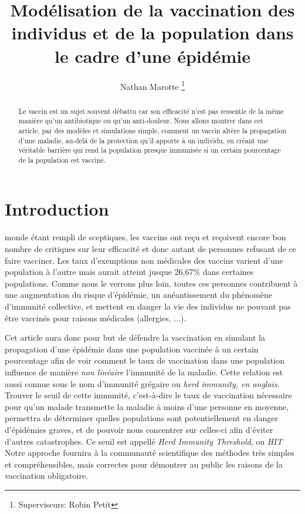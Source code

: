\documentclass[journal, a4paper]{IEEEtran}
\begin{document}
	\title{Modélisation de la vaccination des individus et de la population dans le cadre d'une épidémie}
	\author{Nathan Marotte
	\thanks{Superviseurs: Robin Petit}}
	\maketitle

\begin{abstract}
	Le vaccin est un sujet souvent débattu car son efficacité n'est pas ressentie de la même manière qu'un antibiotique ou qu'un anti-douleur. Nous allons montrer dans cet article, par des modèles et simulations simple, comment un vaccin altère la propagation d'une maladie, au-delà de la protection qu'il apporte à un individu, en créant une véritable barrière qui rend la population presque immunisée si un certain pourcentage de la population est vacciné.
\end{abstract}

\section{Introduction}
	 monde étant rempli de sceptiques, les vaccins ont reçu et reçoivent encore bon nombre de critiques sur leur efficacité et donc autant de personnes refusant de ce faire vacciner. Les taux d'exemptions non médicales des vaccins varient d'une population à l'autre mais aurait atteint jusque 26,67\% \cite{NME_vaccine} dans certaines populations. Comme nous le verrons plus loin, toutes ces personnes contribuent à une augmentation du risque d'épidémie, un anéantissement du phénomène d'immunité collective, et mettent en danger la vie des individus ne pouvant pas être vaccinés pour raisons médicales (allergies, ...).\

	Cet article aura donc pour but de défendre la vaccination en simulant la propagation d'une épidémie dans une population vaccinée à un certain pourcentage afin de voir comment le taux de vaccination dans une population influence de manière \emph{non linéaire} l'immunité de la maladie. Cette relation est aussi connue sous le nom d'immunité grégaire ou \emph{herd immunity, en anglais}.
	Trouver le seuil de cette immunité, c'est-à-dire le taux de vaccination nécessaire pour qu'un malade transmette la maladie à moins d'une personne en moyenne, permettra de déterminer quelles populations sont potentiellement en danger d'épidémies graves, et de pouvoir nous concentrer sur celles-ci afin d'éviter d'autres catastrophes. Ce seuil est appellé \emph{Herd Immunity Threshold}, ou \emph{HIT}
	Notre approche fournira à la communauté scientifique des méthodes très simples et compréhensibles, mais correctes pour démontrer au public les raisons de la vaccination obligatoire.
\end{document}
